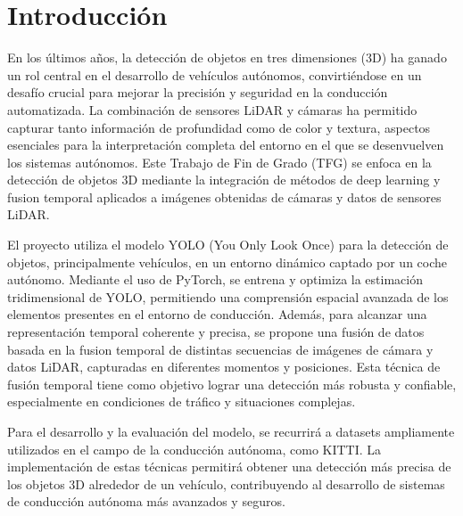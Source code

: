 

\section{Introducción}
\label{sec:introduccion}

En los últimos años, la detección de objetos en tres dimensiones (3D) ha ganado un rol central en el desarrollo de vehículos autónomos, convirtiéndose en un desafío crucial para mejorar la precisión y seguridad en la conducción automatizada. La combinación de sensores LiDAR y cámaras ha permitido capturar tanto información de profundidad como de color y textura, aspectos esenciales para la interpretación completa del entorno en el que se desenvuelven los sistemas autónomos. Este Trabajo de Fin de Grado (TFG) se enfoca en la detección de objetos 3D mediante la integración de métodos de deep learning y fusion temporal aplicados a imágenes obtenidas de cámaras y datos de sensores LiDAR.

El proyecto utiliza el modelo YOLO (You Only Look Once) para la detección de objetos, principalmente vehículos, en un entorno dinámico captado por un coche autónomo. Mediante el uso de PyTorch, se entrena y optimiza la estimación tridimensional de YOLO, permitiendo una comprensión espacial avanzada de los elementos presentes en el entorno de conducción. Además, para alcanzar una representación temporal coherente y precisa, se propone una fusión de datos basada en la fusion temporal de distintas secuencias de imágenes de cámara y datos LiDAR, capturadas en diferentes momentos y posiciones. Esta técnica de fusión temporal tiene como objetivo lograr una detección más robusta y confiable, especialmente en condiciones de tráfico y situaciones complejas.

Para el desarrollo y la evaluación del modelo, se recurrirá a datasets ampliamente utilizados en el campo de la conducción autónoma, como KITTI. La implementación de estas técnicas permitirá obtener una detección más precisa de los objetos 3D alrededor de un vehículo, contribuyendo al desarrollo de sistemas de conducción autónoma más avanzados y seguros.


